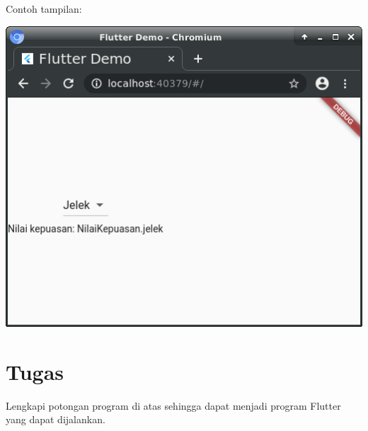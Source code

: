 \documentclass[a4paper,11pt]{article} %
\begin{document}
Contoh tampilan:

{\centering
\includegraphics[scale=0.5]{images/dropdown1.png}
\par}

\section{Tugas}
Lengkapi potongan program di atas sehingga dapat menjadi program Flutter yang
dapat dijalankan.




\end{document}
